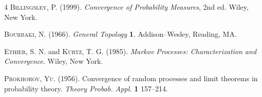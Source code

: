 \documentclass[aap]{imsart}
\theoremstyle{plain}
\theoremstyle{definition}
\begin{document}

\begin{thebibliography}{4}
\textsc{Billingsley, P.} (1999). \textit{Convergence of
Probability Measures}, 2nd ed.
Wiley, New York.

\textsc{Bourbaki, N.}  (1966). \textit{General Topology}  \textbf{1}.
Addison--Wesley, Reading, MA.

\textsc{Ethier, S. N.} and \textsc{Kurtz, T. G.} (1985).
\textit{Markov Processes: Characterization and Convergence}.
Wiley, New York.

\textsc{Prokhorov, Yu.} (1956).
Convergence of random processes and limit theorems in probability
theory. \textit{Theory  Probab.  Appl.}
\textbf{1} 157--214.
\end{thebibliography}
\end{document}
